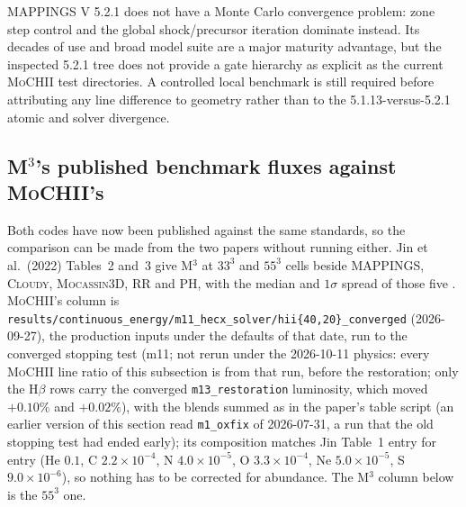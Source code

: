 \documentclass[english,a4paper]{my_memo}
\newcommand{\code}[1]{\texttt{#1}}
\newcommand{\MoCHII}{\textsc{MoCHII}}
\newcommand{\Mthree}{M$^3$}
\newcommand{\Mappings}{MAPPINGS V 5.2.1}
\newcommand{\Mocassin}{\textsc{Mocassin}}
\newcommand{\Cloudy}{\textsc{Cloudy}}
\begin{document}
\Mappings{} does not have a Monte Carlo convergence problem: zone step
control and the global shock/precursor iteration dominate instead.  Its
decades of use and broad model suite are a major maturity advantage, but
the inspected 5.2.1 tree does not provide a gate hierarchy as explicit as
the current \MoCHII{} test directories.  A controlled local benchmark is
still required before attributing any line difference to geometry rather
than to the 5.1.13-versus-5.2.1 atomic and solver divergence.

\subsection{\texorpdfstring{\Mthree{}}{M3}'s published benchmark fluxes
against \MoCHII{}'s}
\label{sec:m3bench}

Both codes have now been published against the same standards, so the
comparison can be made from the two papers without running either.
Jin et al.\ (2022) Tables~2 and~3 give \Mthree{} at $33^3$ and $55^3$ cells
beside MAPPINGS, \Cloudy{}, \Mocassin{}3D, RR and PH, with the median and
$1\sigma$ spread of those five \cite{jin2022}.  \MoCHII{}'s column is
\code{results/\allowbreak continuous\_energy/\allowbreak m11\_hecx\_solver/\allowbreak hii\{40,20\}\_converged}
(2026-09-27), the production inputs under the defaults of that date, run to the
converged stopping test (m11; not rerun under the 2026-10-11 physics:
every \MoCHII{} line ratio of this subsection is from that run, before the
restoration; only the H$\beta$ rows carry the converged \code{m13\_restoration}
luminosity, which moved $+0.10\%$ and $+0.02\%$), with the blends summed as in the paper's table script
(an earlier version of this section read \code{m1\_oxfix} of 2026-07-31, a run
that the old stopping test had ended early); its composition matches Jin
Table~1 entry for entry
(He $0.1$, C $2.2{\times}10^{-4}$, N $4.0{\times}10^{-5}$,
O $3.3{\times}10^{-4}$, Ne $5.0{\times}10^{-5}$,
S $9.0{\times}10^{-6}$), so nothing has to be corrected for abundance.
The \Mthree{} column below is the $55^3$ one.
\end{document}
